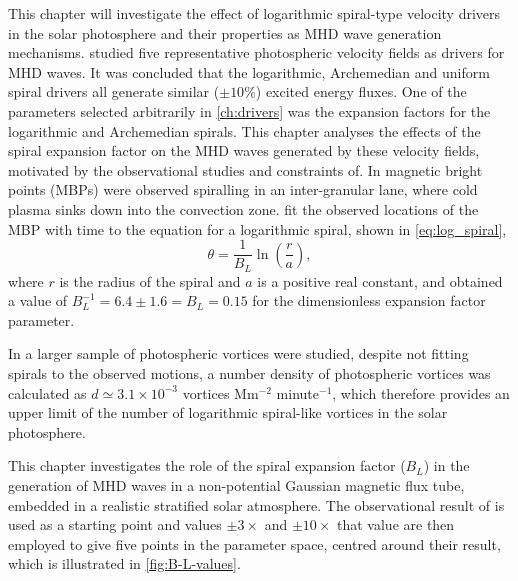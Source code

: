 \documentclass[a4paper,12pt,fourier,authoryear,custommargin]{Classes/PhDThesisPSnPDF}
\providecommand{\DIFaddtex}[1]{{\protect\color{blue}\uwave{#1}}} %
\providecommand{\DIFdeltex}[1]{{\protect\color{red}\sout{#1}}}                      %
\providecommand{\DIFaddbegin}{} %
\providecommand{\DIFaddend}{} %
\providecommand{\DIFdelbegin}{} %
\providecommand{\DIFdelend}{} %
\providecommand{\DIFadd}[1]{\texorpdfstring{\DIFaddtex{#1}}{#1}} %
\providecommand{\DIFdel}[1]{\texorpdfstring{\DIFdeltex{#1}}{}} %
\begin{document}
This chapter will investigate the effect of logarithmic spiral-type velocity drivers in the solar photosphere and their properties as MHD wave generation mechanisms.
 studied five representative photospheric velocity fields as drivers for MHD waves.
It was concluded that the logarithmic, Archemedian and uniform spiral drivers all generate similar ($\pm 10\%$) excited energy fluxes.
One of the parameters selected arbitrarily in \cref{ch:drivers} was the expansion factors for the logarithmic and Archemedian spirals.
This chapter analyses the effects of the spiral expansion factor on the MHD waves generated by these velocity fields, motivated by the observational studies and constraints of\DIFaddbegin \DIFadd{~}\DIFaddend \cite{bonet2008}.
In\DIFaddbegin \DIFadd{~}\DIFaddend \cite{bonet2008} magnetic bright points (MBPs) were observed spiralling in an inter-granular lane, where cold plasma sinks down into the convection zone.
\cite{bonet2008} fit the observed locations of the MBP with time to the equation for a logarithmic spiral, shown in \cref{eq:log_spiral},
\begin{equation}
\theta = \frac{1}{B_L}\ln\left(\frac{r}{a}\right),
\label{eq:log_spiral}
\end{equation}
\citep{feynman1964} where $r$ is the radius of the spiral and $a$ is a positive real constant, and obtained a value of \DIFdelbegin \DIFdel{$B_L^{-1} = 6.4 \pm 1.6 = B_L = 0.15$ }\DIFdelend \DIFaddbegin \DIFadd{$B_L^{-1} = 6.4 \pm 1.6 \equiv B_L = 0.15$ }\DIFaddend for the dimensionless expansion factor parameter.

In\DIFaddbegin \DIFadd{~}\DIFaddend \cite{bonet2010} a larger sample of photospheric vortices were studied, despite not fitting spirals to the observed motions, a number density of photospheric vortices was calculated as $d \simeq 3.1 \times 10^{-3}$ vortices Mm$^{-2}$ minute$^{-1}$, which therefore provides an upper limit of the number of logarithmic spiral-like vortices in the solar photosphere.

This chapter investigates the role of the spiral expansion factor ($B_L$) in the generation of MHD waves in a non-potential Gaussian magnetic flux tube, embedded in a realistic stratified solar atmosphere.
The observational result of\DIFaddbegin \DIFadd{~}\DIFaddend \cite{bonet2008} is used as a starting point and values $\pm 3\times$ and $\pm 10\times$ that value are then employed to give five points in the parameter space, centred around their result, which is illustrated in \cref{fig:B-L-values}.
\end{document}
